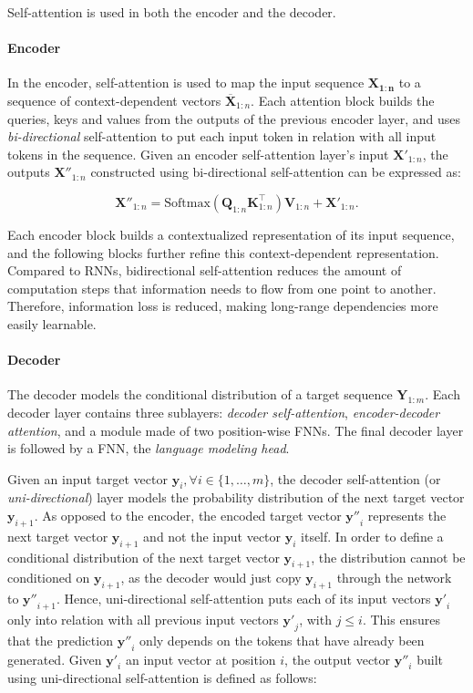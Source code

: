 Self-attention is used in both the encoder and the decoder.

\paragraph{Encoder} 
In the encoder, self-attention is used to map the input sequence $\bm{X_{1:n}}$ to a sequence of context-dependent vectors $\bm{\overline{X}}_{1:n}$. Each attention block builds the queries, keys and values from the outputs of the previous encoder layer, and uses \textit{bi-directional} self-attention to put each input token in relation with all input tokens in the sequence. Given an encoder self-attention layer's input $\bm{X'}_{1:n}$, the outputs $\bm{X''}_{1:n}$ constructed using bi-directional self-attention can be expressed as:

\begin{equation}
    \bm{X''}_{1:n} = \mathrm{Softmax}(\bm{Q}_{1:n}\bm{K}^{\top}_{1:n}) \bm{V}_{1:n} + \bm{X'}_{1:n}.
\end{equation}

Each encoder block builds a contextualized representation of its input sequence, and the following blocks further refine this context-dependent representation. Compared to \acp{RNN}, bidirectional self-attention reduces the amount of computation steps that information needs to flow from one point to another. Therefore, information loss is reduced, making long-range dependencies more easily learnable.

\paragraph{Decoder} 

The decoder models the conditional distribution of a target sequence $\bm{Y}_{1:m}$. Each decoder layer contains three sublayers: \textit{decoder self-attention}, \textit{encoder-decoder attention}, and a module made of two position-wise \acp{FNN}. The final decoder layer is followed by a \ac{FNN}, the \textit{language modeling head}. 

Given an input target vector $\bm{y}_i, \forall i \in \{1, \ldots, m\}$, the decoder self-attention (or \textit{uni-directional}) layer models the probability distribution of the next target vector $\bm{y}_{i+1}$. As opposed to the encoder, the encoded target vector $\bm{y''}_{i}$ represents the next target vector $\bm{y}_{i+1}$ and not the input vector $\bm{y}_{i}$ itself. In order to define a conditional distribution of the next target vector $\bm{y}_{i+1}$, the distribution cannot be conditioned on $\bm{y}_{i+1}$, as the decoder would just copy $\bm{y}_{i+1}$ through the network to $\bm{y''}_{i+1}$. Hence, uni-directional self-attention puts each of its input vectors $\bm{y'}_i$ only into relation with all previous input vectors $\bm{y'}_j$, with $j \leq i$. This ensures that the prediction $\bm{y''}_i$ only depends on the tokens that have already been generated. Given $\bm{y'}_i$ an input vector at position $i$, the output vector $\bm{y''}_i$ built using uni-directional self-attention is defined as follows:

